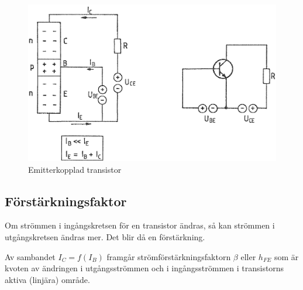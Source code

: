 \begin{figure}
\includegraphics[width=.8\textwidth]{images/cropped_pdfs/bild_2_2-18.pdf}
\caption{Emitterkopplad transistor}
\label{fig:BildII2-18}
\end{figure}

\subsection{Förstärkningsfaktor}

Om strömmen i ingångskretsen för en transistor ändras, så kan strömmen i
utgångskretsen ändras mer. Det blir då en förstärkning.

Av sambandet \(I_C = f(I_B)\) framgår strömförstärkningsfaktorn \(\beta\) eller
\(h_{FE}\) som är kvoten av ändringen i utgångsströmmen och i ingångsströmmen i
transistorns aktiva (linjära) område.

